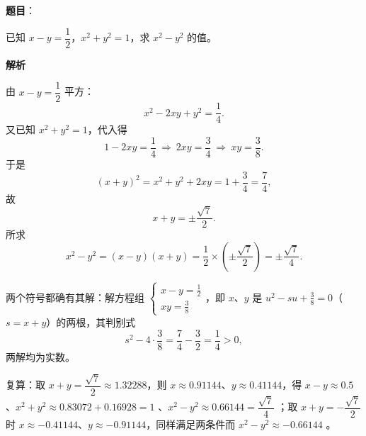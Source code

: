 \begin{answer}

\textbf{题目}：

已知 $x-y=\dfrac12$，$x^2+y^2=1$，求 $x^2-y^2$ 的值。

\textbf{解析}

由 $x-y=\dfrac12$ 平方：
\nopagebreak[4]
\[
x^2-2xy+y^2=\frac14.
\]
又已知 $x^2+y^2=1$，代入得
\nopagebreak[4]
\[
1-2xy=\frac14\ \Longrightarrow\ 2xy=\frac34\ \Longrightarrow\ xy=\frac38.
\]
于是
\nopagebreak[4]
\[
(x+y)^2=x^2+y^2+2xy=1+\frac34=\frac74,
\]
故
\nopagebreak[4]
\[
x+y=\pm\frac{\sqrt7}{2}.
\]
所求
\nopagebreak[4]
\[
x^2-y^2=(x-y)(x+y)=\frac12\times\left(\pm\frac{\sqrt7}{2}\right)=\pm\frac{\sqrt7}{4}.
\]

两个符号都确有其解：解方程组 $\begin{cases}x-y=\frac12\\ xy=\frac38\end{cases}$，即 $x$、$y$ 是 $u^2-su+\frac38=0$（$s=x+y$）的两根，其判别式
\nopagebreak[4]
\[
s^2-4\cdot\frac38=\frac74-\frac32=\frac14>0,
\]
两解均为实数。

复算：取 $x+y=\dfrac{\sqrt7}{2}\approx1.32288$，则 $x\approx0.91144$、$y\approx0.41144$，得 $x-y\approx0.5$ 、$x^2+y^2\approx0.83072+0.16928=1$ 、$x^2-y^2\approx0.66144=\dfrac{\sqrt7}{4}$ ；取 $x+y=-\dfrac{\sqrt7}{2}$ 时 $x\approx-0.41144$、$y\approx-0.91144$，同样满足两条件而 $x^2-y^2\approx-0.66144$ 。


\end{answer}
